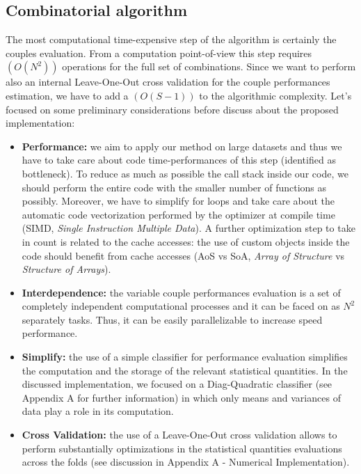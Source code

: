 \documentclass{standalone}
\begin{document}
\subsection[Pairs evaluation]{Combinatorial algorithm}\label{implementation:couples}

The most computational time-expensive step of the algorithm is certainly the couples evaluation.
From a computation point-of-view this step requires $(O(N^2))$ operations for the full set of combinations.
Since we want to perform also an internal Leave-One-Out cross validation for the couple performances estimation, we have to add a $(O(S-1))$ to the algorithmic complexity.
Let's focused on some preliminary considerations before discuss about the proposed implementation:

\begin{itemize}

\item \textbf{Performance:} we aim to apply our method on large datasets and thus we have to take care about code time-performances of this step (identified as bottleneck).
To reduce as much as possible the call stack inside our code, we should perform the entire code with the smaller number of functions as possibly.
Moreover, we have to simplify for loops and take care about the automatic code vectorization performed by the optimizer at compile time (SIMD, \emph{Single Instruction Multiple Data}).
A further optimization step to take in count is related to the cache accesses: the use of custom objects inside the code should benefit from cache accesses (AoS vs SoA, \emph{Array of Structure} vs \emph{Structure of Arrays}).

\item \textbf{Interdependence:} the variable couple performances evaluation is a set of completely independent computational processes and it can be faced on as $N^2$ separately tasks.
Thus, it can be easily parallelizable to increase speed performance.

\item \textbf{Simplify:} the use of a simple classifier for performance evaluation simplifies the computation and the storage of the relevant statistical quantities.
In the discussed implementation, we focused on a Diag-Quadratic classifier (see Appendix A for further information) in which only means and variances of data play a role in its computation.

\item \textbf{Cross Validation:} the use of a Leave-One-Out cross validation allows to perform substantially optimizations in the statistical quantities evaluations across the folds (see discussion in Appendix A - Numerical Implementation).


\end{itemize}
\end{document}
